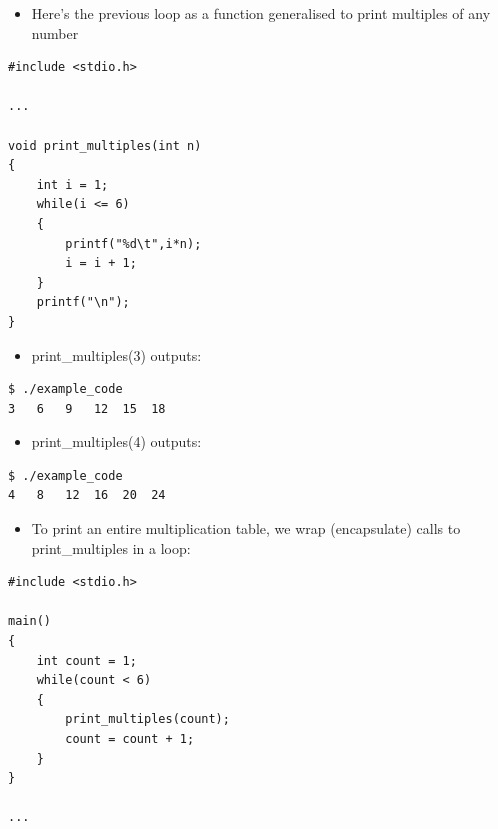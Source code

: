 \documentclass{beamer}
\begin{document}
\begin{frame}[fragile]
\begin{itemize}
\item Here's the previous loop as a function generalised to print multiples of any number
\end{itemize}
\begin{block}{}
\begin{lstlisting}
#include <stdio.h>

...

void print_multiples(int n)
{
    int i = 1;
    while(i <= 6)
    {
        printf("%d\t",i*n);
        i = i + 1;
    }
    printf("\n");
}
\end{lstlisting}
\end{block}

\end{frame}


\begin{frame}[fragile]
\begin{itemize}
\item print\_multiples(3) outputs:
\end{itemize}

\begin{block}{}
\begin{lstlisting}
$ ./example_code
3	6	9	12	15	18
\end{lstlisting}
\end{block}

\begin{itemize}
\item print\_multiples(4) outputs:
\end{itemize}

\begin{block}{}
\begin{lstlisting}
$ ./example_code
4	8	12	16	20	24
\end{lstlisting}
\end{block}

\end{frame}

 \begin{frame}[fragile]
\begin{itemize}
\item To print an entire multiplication table, we wrap (encapsulate) calls to print\_multiples in a loop:
\end{itemize}
\begin{block}{}
\begin{lstlisting}
#include <stdio.h>

main() 
{
    int count = 1;
    while(count < 6)
    {
        print_multiples(count);
        count = count + 1;
    }
}

... 
\end{lstlisting}
\end{block}
\end{frame}
\end{document}
